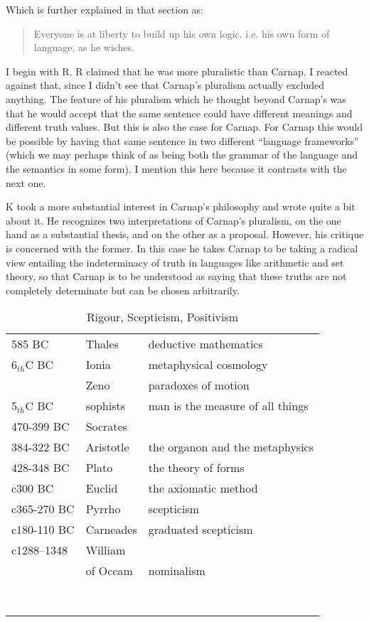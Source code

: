 Which is further explained in that section as:
\begin{quote}
Everyone is at liberty to build up his own logic. i.e. his own form of language, as he wishes.
\end{quote}

I begin with R.
R claimed that he was more pluralistic than Carnap.
I reacted against that, since I didn't see that Carnap's pluralism actually excluded anything.
The feature of his pluralism which he thought beyond Carnap's was that he would accept that the same sentence could have different meanings and different truth values.
But this is also the case for Carnap.
For Carnap this would be possible by having that same sentence in two different ``language frameworks'' (which we may perhaps think of as being both the grammar of the language and the semantics in some form).
I mention this here because it contrasts with the next one.

K took a more substantial interest in Carnap's philosophy and wrote quite a bit about it.
He recognizes two interpretations of Carnap's pluralism, on the one hand as a substantial thesis, and on the other as a proposal.
However, his critique is concerned with the former.
In this case he takes Carnap to be taking a radical view entailing the indeterminacy of truth in languages like arithmetic and set theory, so that Carnap is to be understood as saying that these truths are not completely determinate but can be chosen arbitrarily.

\begin{table}[h]
\begin{center}
\begin{tabular}{|l l p{5cm}|}
\hline
585 BC & Thales & deductive mathematics \\
6$_{th}$C BC & Ionia & metaphysical cosmology \\
 & Zeno & paradoxes of motion \\
5$_{th}$C BC & sophists & man is the measure of all things \\
470-399 BC & Socrates & \\
384-322 BC & Aristotle & the organon and the metaphysics \\
428-348 BC & Plato & the theory of forms \\

c300 BC & Euclid & the axiomatic method \\
c365-270 BC & Pyrrho & scepticism \\
c180-110 BC & Carneades & graduated scepticism \\
c1288–1348 & William & \\
& of Occam & nominalism \\
 &  & \\
 &  & \\
 &  & \\
 &  & \\
 &  & \\
 &  & \\
 &  & \\
 &  & \\
\hline
\end{tabular}
\caption{Rigour, Scepticism, Positivism}
\label{tab:RigourScepticismPositivism}
\end{center}
\end{table}
